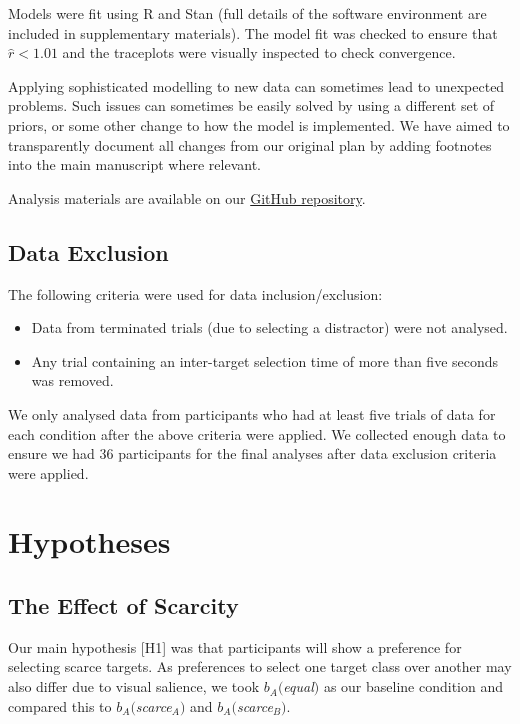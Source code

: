 \documentclass[12pt]{article}
\begin{document}
Models were fit using R \citep{Rcoreteam} and Stan \citep{rstan} (full details of the software environment are included in supplementary materials). The model fit was checked to ensure that $\hat{r} <1.01$ and the traceplots were visually inspected to check convergence.  

Applying sophisticated modelling to new data can sometimes lead to unexpected problems. Such issues can sometimes be easily solved by using a different set of priors, or some other change to how the model is implemented. We have aimed to transparently document all changes from our original plan by adding footnotes into the main manuscript where relevant.

Analysis materials are available on our  \href{https://github.com/Riadsala/foraging_scarcity}{GitHub repository}.

\subsection{Data Exclusion}

The following criteria were used for data inclusion/exclusion:

\begin{itemize}
    \item Data from terminated trials (due to selecting a distractor) were not  analysed.
    \item Any trial containing an inter-target selection time of more than five seconds was removed.
\end{itemize}

We only analysed data from participants who had at least five trials of data for each condition after the above criteria were applied. We collected enough data to ensure we had 36 participants for the final analyses after data exclusion criteria were applied.

\section{Hypotheses}

\subsection{The Effect of Scarcity}
Our main hypothesis [H1] was that participants will show a preference for selecting scarce targets. As preferences to select one target class over another may also differ due to visual salience, we took $b_A($\textit{equal}$)$ as our baseline condition and compared this to $b_A($\textit{scarce$_A$}$)$ and $b_A($\textit{scarce$_B$}$)$.
\end{document}
